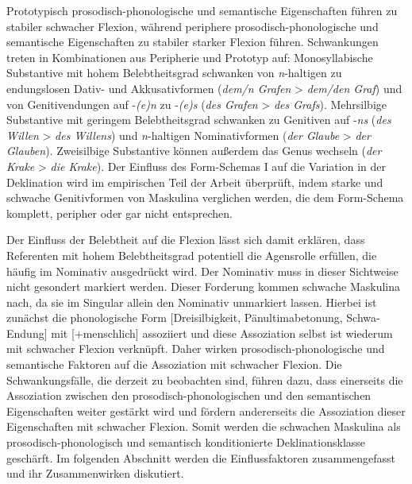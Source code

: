 Prototypisch prosodisch-phonologische und semantische Eigenschaften führen zu stabiler schwacher Flexion, während periphere prosodisch-phonologische und semantische Eigenschaften zu stabiler starker Flexion führen. Schwankungen treten in Kombinationen aus Peripherie und Prototyp auf: Monosyllabische Substantive mit hohem Belebtheitsgrad schwanken von \textit{n}-haltigen zu endungslosen Dativ- und Akkusativformen (\textit{dem/n Grafen} > \textit{dem/den Graf}) und von Genitivendungen auf -\textit{(e)n} zu -\textit{(e)s} (\textit{des Grafen} > \textit{des Grafs}). Mehrsilbige Substantive mit geringem Belebtheitsgrad schwanken zu Genitiven auf -\textit{ns} (\textit{des Willen} > \textit{des Willens}) und \textit{n}-haltigen Nominativformen (\textit{der Glaube} > \textit{der Glauben}). Zweisilbige Substantive können außerdem das Genus wechseln (\textit{der Krake} > \textit{die Krake}). Der Einfluss des Form-Schemas I auf die Variation in der Deklination wird im empirischen Teil der Arbeit überprüft, indem starke und schwache Genitivformen von Maskulina verglichen werden, die dem Form-Schema komplett, peripher oder gar nicht entsprechen.   



Der Einfluss der Belebtheit auf die Flexion lässt sich damit erklären, dass Referenten mit hohem Belebtheitsgrad potentiell die Agensrolle erfüllen, die häufig im Nominativ ausgedrückt wird. Der Nominativ muss in dieser Sichtweise nicht gesondert markiert werden. Dieser Forderung kommen schwache Maskulina nach, da sie im Singular allein den Nominativ unmarkiert lassen. Hierbei ist zunächst die phonologische Form [Dreisilbigkeit, Pänultimabetonung, Schwa-Endung] mit [+menschlich] assoziiert und diese Assoziation selbst ist wiederum mit schwacher Flexion verknüpft. Daher wirken prosodisch-phonologische und semantische Faktoren auf die Assoziation mit schwacher Flexion. Die Schwankungsfälle, die derzeit zu beobachten sind, führen dazu, dass einerseits die Assoziation zwischen den prosodisch-phonologischen und den semantischen Eigenschaften weiter gestärkt wird und fördern andererseits die Assoziation dieser Eigenschaften mit schwacher Flexion. Somit werden die schwachen Maskulina als prosodisch-phonologisch und semantisch konditionierte Deklinationsklasse geschärft. Im folgenden Abschnitt werden die Einflussfaktoren zusammengefasst und ihr Zusammenwirken diskutiert.

